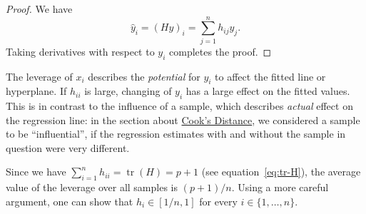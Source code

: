 \documentclass[
  a4paper,
]{article}
\theoremstyle{definition}
\theoremstyle{definition}
\theoremstyle{definition}
\theoremstyle{definition}
\theoremstyle{remark}
\begin{document}
\begin{proof}
We have
\begin{equation*}
  \hat y_i
  = (H y)_i
  = \sum_{j=1}^n h_{ij} y_j.
\end{equation*}
Taking derivatives with respect to \(y_i\) completes the proof.
\end{proof}

The leverage of \(x_i\) describes the \emph{potential} for \(y_i\) to affect the fitted
line or hyperplane. If \(h_{ii}\) is large, changing of \(y_i\) has a large effect
on the fitted values. This is in contrast to the influence of a sample, which
describes \emph{actual} effect on the regression line: in the section about \hyperref[influence]{Cook's
Distance}, we considered a sample to be ``influential'', if the regression
estimates with and without the sample in question were very different.

Since we have \(\sum_{i=1}^n h_{ii} = \mathop{\mathrm{tr}}(H) = p+1\) (see equation~\eqref{eq:tr-H}),
the average value of the leverage over all samples is \((p+1) / n\).
Using a more careful argument,
one can show that \(h_i \in [1/n, 1]\) for every \(i \in \{1, \ldots, n\}\).
\end{document}
